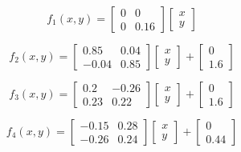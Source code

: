 \documentclass[usenames, dvipsnames, aspectratio=169]{beamer}
\begin{document}
\begin{frame}
  \vfill
  \large

  \begin{minipage}{.48\textwidth}
    \[
    f_1(x, y)
    =
    \begin{bmatrix}
      0 & 0 \\ 0 & 0.16
    \end{bmatrix}
    \begin{bmatrix}
      x \\ y
    \end{bmatrix}
    \]
  \end{minipage}%
  \hfill
  \begin{minipage}{.48\textwidth}
    \[
    f_2(x, y)
    =
    \begin{bmatrix}
      0.85 & 0.04 \\ -0.04 & 0.85
    \end{bmatrix}
    \begin{bmatrix}
      x \\ y
    \end{bmatrix}
    +
    \begin{bmatrix}
      0 \\ 1.6
    \end{bmatrix}
    \]
  \end{minipage}

  \vfill

  \begin{minipage}{.48\textwidth}
    \[
    f_3(x, y)
    =
    \begin{bmatrix}
      0.2 & -0.26 \\ 0.23 & 0.22
    \end{bmatrix}
    \begin{bmatrix}
      x \\ y
    \end{bmatrix}
    +
    \begin{bmatrix}
      0 \\ 1.6
    \end{bmatrix}
    \]
  \end{minipage}%
  \hfill
  \begin{minipage}{.48\textwidth}
    \[
    f_4(x, y)
    =
    \begin{bmatrix}
      -0.15 & 0.28 \\ -0.26 & 0.24
    \end{bmatrix}
    \begin{bmatrix}
      x \\ y
    \end{bmatrix}
    +
    \begin{bmatrix}
      0 \\ 0.44
    \end{bmatrix}
    \]
  \end{minipage}


  \vfill
\end{frame}
\end{document}
